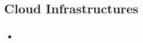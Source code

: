 \documentclass[12pt]{article}
\begin{document}
\thispagestyle{firstpage}

\subsection*{Cloud Infrastructures}
\subsubsection*{}
\begin{itemize}
    \item 
\end{itemize}
\end{document}
